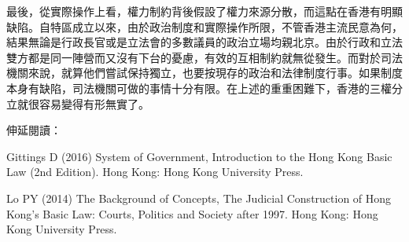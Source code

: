 最後，從實際操作上看，權力制約背後假設了權力來源分散，而這點在香港有明顯缺陷。自特區成立以來，由於政治制度和實際操作所限，不管香港主流民意為何，結果無論是行政長官或是立法會的多數議員的政治立場均親北京。由於行政和立法雙方都是同一陣營而又沒有下台的憂慮，有效的互相制約就無從發生。而對於司法機關來說，就算他們嘗試保持獨立，也要按現存的政治和法律制度行事。如果制度本身有缺陷，司法機關可做的事情十分有限。在上述的重重困難下，香港的三權分立就很容易變得有形無實了。



伸延閱讀：

Gittings D (2016) System of Government, Introduction to the Hong Kong Basic Law (2nd Edition). Hong Kong: Hong Kong University Press.

Lo PY (2014) The Background of Concepts, The Judicial Construction of Hong Kong’s Basic Law: Courts, Politics and Society after 1997. Hong Kong: Hong Kong University Press.